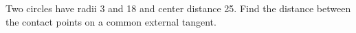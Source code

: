 Two circles have radii 3 and 18 and center distance 25. Find the distance between the contact points on a common external tangent.
